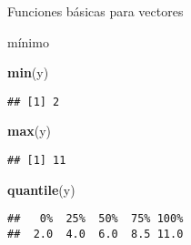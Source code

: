 \documentclass[ignorenonframetext,]{beamer}
\newenvironment{Shaded}{\begin{snugshade}}{\end{snugshade}}
\newcommand{\KeywordTok}[1]{\textcolor[rgb]{0.13,0.29,0.53}{\textbf{#1}}}
\newcommand{\NormalTok}[1]{#1}
\begin{document}
\begin{frame}[fragile]{Funciones básicas para vectores}

mínimo

\begin{Shaded}
\begin{Highlighting}[]
\KeywordTok{min}\NormalTok{(y)}
\end{Highlighting}
\end{Shaded}

\begin{verbatim}
## [1] 2
\end{verbatim}

\begin{Shaded}
\begin{Highlighting}[]
\KeywordTok{max}\NormalTok{(y)}
\end{Highlighting}
\end{Shaded}

\begin{verbatim}
## [1] 11
\end{verbatim}

\begin{Shaded}
\begin{Highlighting}[]
\KeywordTok{quantile}\NormalTok{(y)}
\end{Highlighting}
\end{Shaded}

\begin{verbatim}
##   0%  25%  50%  75% 100% 
##  2.0  4.0  6.0  8.5 11.0
\end{verbatim}

\end{frame}
\end{document}
